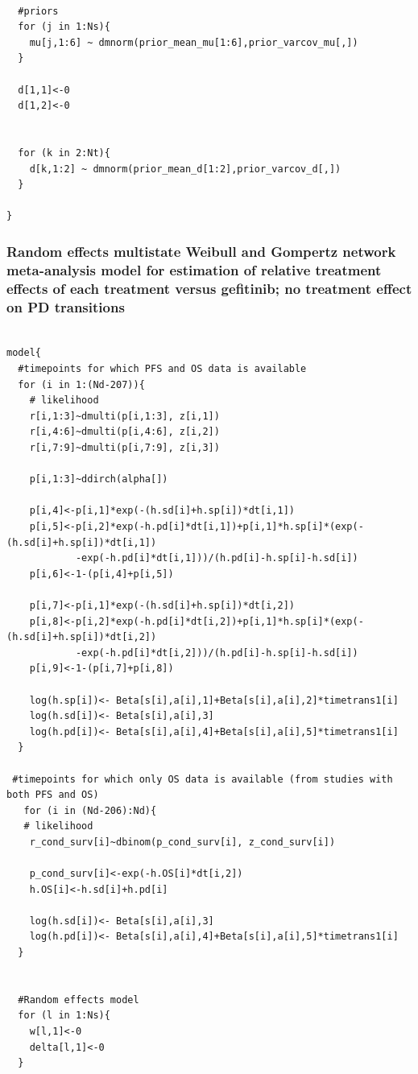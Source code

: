 \documentclass[11pt,final,fleqn]{article}\usepackage[]{graphicx}\usepackage[]{color}
\theoremstyle{plain}
\begin{document}
\begin{appendices}
\begin{verbatim}
  
  #priors
  for (j in 1:Ns){
    mu[j,1:6] ~ dmnorm(prior_mean_mu[1:6],prior_varcov_mu[,]) 
  }
  
  d[1,1]<-0
  d[1,2]<-0
  

  for (k in 2:Nt){
    d[k,1:2] ~ dmnorm(prior_mean_d[1:2],prior_varcov_d[,]) 
  }
  
}

\end{verbatim}

\subsubsection{Random effects multistate Weibull and Gompertz network meta-analysis model for estimation of relative treatment effects of each treatment versus gefitinib; no treatment effect on PD transitions}
\begin{verbatim} 

model{
  #timepoints for which PFS and OS data is available
  for (i in 1:(Nd-207)){
    # likelihood
    r[i,1:3]~dmulti(p[i,1:3], z[i,1]) 
    r[i,4:6]~dmulti(p[i,4:6], z[i,2]) 
    r[i,7:9]~dmulti(p[i,7:9], z[i,3]) 
    
    p[i,1:3]~ddirch(alpha[])
    
    p[i,4]<-p[i,1]*exp(-(h.sd[i]+h.sp[i])*dt[i,1])
    p[i,5]<-p[i,2]*exp(-h.pd[i]*dt[i,1])+p[i,1]*h.sp[i]*(exp(-(h.sd[i]+h.sp[i])*dt[i,1])
    		-exp(-h.pd[i]*dt[i,1]))/(h.pd[i]-h.sp[i]-h.sd[i])
    p[i,6]<-1-(p[i,4]+p[i,5])
    
    p[i,7]<-p[i,1]*exp(-(h.sd[i]+h.sp[i])*dt[i,2])
    p[i,8]<-p[i,2]*exp(-h.pd[i]*dt[i,2])+p[i,1]*h.sp[i]*(exp(-(h.sd[i]+h.sp[i])*dt[i,2])
    		-exp(-h.pd[i]*dt[i,2]))/(h.pd[i]-h.sp[i]-h.sd[i])
    p[i,9]<-1-(p[i,7]+p[i,8])
    
    log(h.sp[i])<- Beta[s[i],a[i],1]+Beta[s[i],a[i],2]*timetrans1[i] 
    log(h.sd[i])<- Beta[s[i],a[i],3] 
    log(h.pd[i])<- Beta[s[i],a[i],4]+Beta[s[i],a[i],5]*timetrans1[i]
  }
  
 #timepoints for which only OS data is available (from studies with both PFS and OS)
   for (i in (Nd-206):Nd){
   # likelihood
    r_cond_surv[i]~dbinom(p_cond_surv[i], z_cond_surv[i]) 
    
    p_cond_surv[i]<-exp(-h.OS[i]*dt[i,2])
    h.OS[i]<-h.sd[i]+h.pd[i]
    
    log(h.sd[i])<- Beta[s[i],a[i],3] 
    log(h.pd[i])<- Beta[s[i],a[i],4]+Beta[s[i],a[i],5]*timetrans1[i]
  }
    
 
  #Random effects model
  for (l in 1:Ns){
    w[l,1]<-0
    delta[l,1]<-0
  }
  

\end{verbatim}
\end{appendices}
\end{document}
